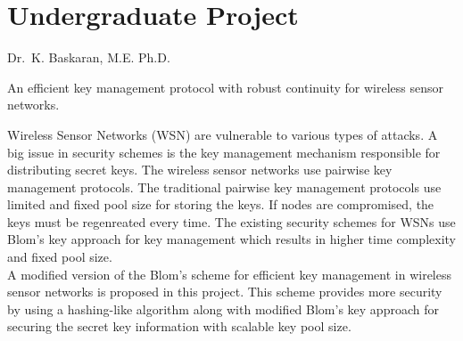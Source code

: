 \documentclass{cv}
\begin{document}
\section{Undergraduate Project}
\begin{description}[leftmargin=50pt,labelwidth=50pt,labelsep=0pt]
  \item[Guide] Dr.\ K. Baskaran, M.E. Ph.D.
  \item[Title] An efficient key management protocol with robust continuity for wireless sensor networks.
  \item[] Wireless Sensor Networks (WSN) are vulnerable to various types of attacks.  A big issue in security schemes is the key management mechanism responsible for distributing secret keys.  The wireless sensor networks use pairwise key management protocols.  The traditional pairwise key management protocols use limited and fixed pool size for storing the keys.  If nodes are compromised, the keys must be regenreated every time.  The existing security schemes for WSNs use Blom's key approach for key management which results in higher time complexity and fixed pool size.\\
    A modified version of the Blom's scheme for efficient key management in wireless sensor networks is proposed in this project.  This scheme provides more security by using a hashing-like algorithm along with modified Blom's key approach for securing the secret key information with scalable key pool size.
\end{description}
\end{document}
